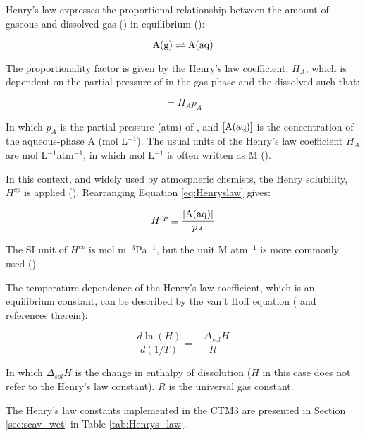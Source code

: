 \medskip

Henry's law expresses the proportional relationship between the amount of gaseous and dissolved gas () in equilibrium (\cite{SeinfeldSpyros}): 

\begin{equation*}
    \mathrm{A(g)} \rightleftharpoons \mathrm{A(aq)}
\end{equation*}

The proportionality factor is given by the Henry's law coefficient, $H_A$, which is dependent on the partial pressure of  in the gas phase and the dissolved  such that: 

\begin{equation}
    [\chem{A(aq)}] = H_Ap_A
    \label{eq:Henryslaw}
\end{equation}

In which $p_A$ is the partial pressure (atm) of , and $[\mathrm{A(aq)}]$ is the concentration of the aqueous-phase A (mol L$^{-1}$). The usual units of the Henry's law coefficient $H_A$ are mol L$^{-1}$atm$^{-1}$, in which mol L$^{-1}$ is often written as M (\cite{SeinfeldSpyros}).

\medskip

In this context, and widely used by atmospheric chemists, the Henry solubility, $H^{cp}$ is applied (\cite{Sander2015}). Rearranging Equation \ref{eq:Henryslaw} gives: 

\begin{equation}
    H^{cp} \equiv \frac{[\mathrm{A(aq)}]}{p_A}
    \label{eq:HenrySol}
\end{equation}

The SI unit of $H^{cp}$ is mol m$^{-3}$Pa$^{-1}$, but the unit M atm$^{-1}$ is more commonly used (\cite{Sander2015}).

\medskip

The temperature dependence of the Henry's law coefficient, which is an equilibrium constant, can be described by the van't Hoff equation (\cite{Sander2015} and references therein): 

\begin{equation*}
    \frac{d\ln(H)}{d(1/T)} = \frac{-\Delta_{sol}H}{R}
    \label{eq:vantHoff}
\end{equation*}

In which $\Delta_{sol}H$ is the change in enthalpy of dissolution ($H$ in this case does not refer to the Henry's law constant). $R$ is the universal gas constant. 

\medskip

The Henry's law constants implemented in the CTM3 are presented in Section \ref{sec:scav_wet} in Table \ref{tab:Henrys_law}. 

